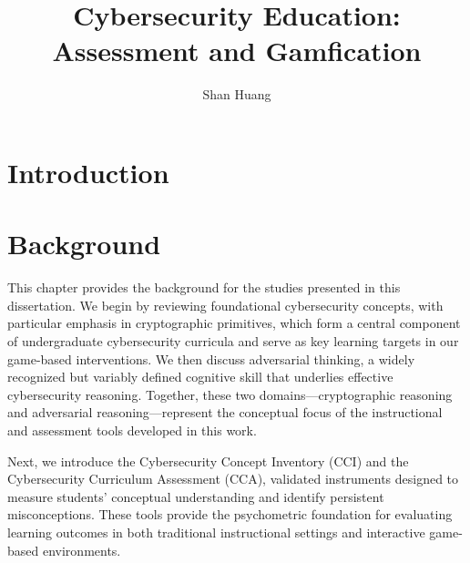 \documentclass{uofithesis}
\title{Cybersecurity Education: Assessment and Gamfication}
\author{Shan Huang}
\begin{document}
\maketitle



\tableofcontents


\section{Introduction}

\section{Background}
This chapter provides the background for the studies presented in this dissertation. 
We begin by reviewing foundational cybersecurity concepts, with particular emphasis in cryptographic primitives, which form a central component of undergraduate cybersecurity curricula and serve as key learning targets in our game-based interventions. 
We then discuss adversarial thinking, a widely recognized but variably defined cognitive skill that underlies effective cybersecurity reasoning. Together, these two domains—cryptographic reasoning and adversarial reasoning—represent the conceptual focus of the instructional and assessment tools developed in this work.

Next, we introduce the Cybersecurity Concept Inventory (CCI) and the Cybersecurity Curriculum Assessment (CCA), validated instruments designed to measure students’ conceptual understanding and identify persistent misconceptions. These tools provide the psychometric foundation for evaluating learning outcomes in both traditional instructional settings and interactive game-based environments.
\end{document}
